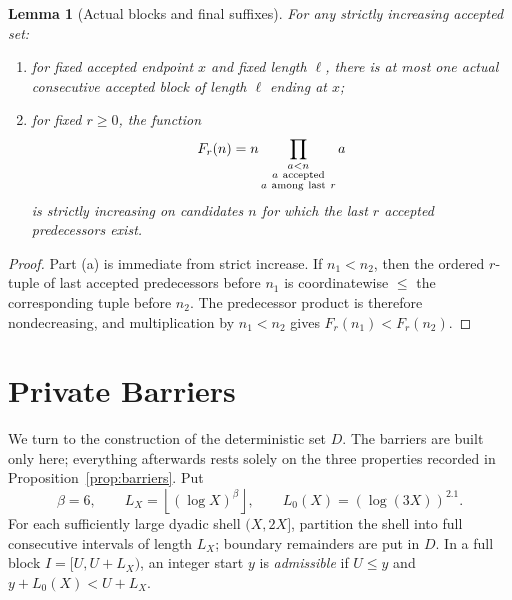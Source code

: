 \documentclass[11pt]{article}
\newtheorem{lemma}[theorem]{Lemma}
\theoremstyle{definition}
\newcommand{\floor}[1]{\left\lfloor #1\right\rfloor}
\newcommand{\1}{\mathbf 1}
\begin{document}
\begin{lemma}[Actual blocks and final suffixes]\label{lem:monotonicity}
For any strictly increasing accepted set:
\begin{enumerate}[label=(\alph*)]
\item for fixed accepted endpoint \(x\) and fixed length \(\ell\), there is
at most one actual consecutive accepted block of length \(\ell\) ending at
\(x\);
\item for fixed \(r\ge0\), the function
\[
  F_r(n)=n\prod_{\substack{a<n\\a\ {\rm accepted}\\a\ {\rm among\ last}\ r}}
  a
\]
is strictly increasing on candidates \(n\) for which the last \(r\) accepted
predecessors exist.
\end{enumerate}
\end{lemma}

\begin{proof}
Part (a) is immediate from strict increase.  If \(n_1<n_2\), then the ordered
\(r\)-tuple of last accepted predecessors before \(n_1\) is coordinatewise
\(\le\) the corresponding tuple before \(n_2\).  The predecessor product is
therefore nondecreasing, and multiplication by \(n_1<n_2\) gives
\(F_r(n_1)<F_r(n_2)\).
\end{proof}

\section{Private Barriers}\label{sec:barriers}

We turn to the construction of the deterministic set \(D\).  The barriers are
built only here; everything afterwards rests solely on the three properties
recorded in Proposition~\ref{prop:barriers}.  Put
\[
  \beta=6,\qquad L_X=\floor{(\log X)^\beta},\qquad
  L_0(X)=(\log(3X))^{2.1}.
\]
For each sufficiently large dyadic shell \((X,2X]\), partition the shell into
full consecutive intervals of length \(L_X\); boundary remainders are put in
\(D\).  In a full block \(I=[U,U+L_X)\), an integer start \(y\) is
\emph{admissible} if \(U\le y\) and \(y+L_0(X)<U+L_X\).
\end{document}
